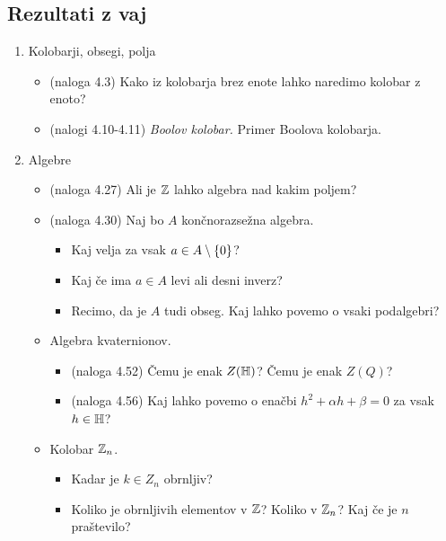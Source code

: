 \subsection*{Rezultati z vaj}
\begin{enumerate}
    \item Kolobarji, obsegi, polja
    \begin{itemize}
        \item (naloga 4.3) Kako iz kolobarja brez enote lahko naredimo kolobar z enoto?
        \item (nalogi 4.10-4.11) \emph{Boolov kolobar.} Primer Boolova kolobarja.
    \end{itemize}

    \item Algebre
    \begin{itemize}
        \item (naloga 4.27) Ali je $\mathbb{Z}$ lahko algebra nad kakim poljem?
        \item (naloga 4.30) Naj bo $A$ končnorazsežna algebra.    
        \begin{itemize}
            \item Kaj velja za vsak $a \in A \setminus \{0\}$?
            \item Kaj če ima $a \in A$ levi ali desni inverz?
            \item Recimo, da je $A$ tudi obseg. Kaj lahko povemo o vsaki podalgebri?
        \end{itemize}
        \item Algebra kvaternionov.
        \begin{itemize}
            \item (naloga 4.52) Čemu je enak $Z(\mathbb{H})$? Čemu je enak $Z(Q)$?
            \item (naloga 4.56) Kaj lahko povemo o enačbi $h^2 + \alpha h + \beta = 0$ za vsak $h \in \mathbb{H}$?
        \end{itemize}

        \item Kolobar $\mathbb{Z}_n$.
        \begin{itemize}
            \item Kadar je $k \in Z_n$ obrnljiv?
            \item Koliko je obrnljivih elementov v $\mathbb{Z}$? Koliko v $\mathbb{Z}_n$? Kaj če je $n$ praštevilo?
        \end{itemize}
    \end{itemize}
\end{enumerate}